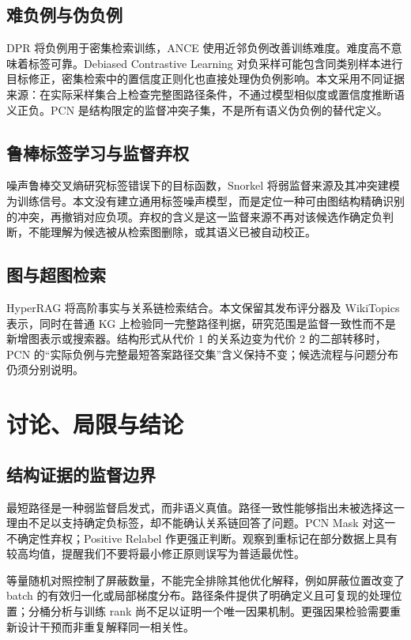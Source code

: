 \documentclass[UTF8,a4paper,10pt,fontset=fandol]{ctexart}
\begin{document}
\subsection{难负例与伪负例}
DPR 将负例用于密集检索训练，ANCE 使用近邻负例改善训练难度\cite{dpr,ance}。难度高不意味着标签可靠。Debiased Contrastive Learning 对负采样可能包含同类别样本进行目标修正\cite{debiased}，密集检索中的置信度正则化也直接处理伪负例影响\cite{false_negative}。本文采用不同证据来源：在实际采样集合上检查完整图路径条件，不通过模型相似度或置信度推断语义正负。PCN 是结构限定的监督冲突子集，不是所有语义伪负例的替代定义。

\subsection{鲁棒标签学习与监督弃权}
噪声鲁棒交叉熵研究标签错误下的目标函数\cite{gce}，Snorkel 将弱监督来源及其冲突建模为训练信号\cite{snorkel}。本文没有建立通用标签噪声模型，而是定位一种可由图结构精确识别的冲突，再撤销对应负项。弃权的含义是这一监督来源不再对该候选作确定负判断，不能理解为候选被从检索图删除，或其语义已被自动校正。

\subsection{图与超图检索}
HyperRAG 将高阶事实与关系链检索结合\cite{hyperrag}。本文保留其发布评分器及 WikiTopics 表示，同时在普通 KG 上检验同一完整路径判据，研究范围是监督一致性而不是新增图表示或搜索器。结构形式从代价 1 的关系边变为代价 2 的二部转移时，PCN 的“实际负例与完整最短答案路径交集”含义保持不变；候选流程与问题分布仍须分别说明。

\section{讨论、局限与结论}
\subsection{结构证据的监督边界}
最短路径是一种弱监督启发式，而非语义真值。路径一致性能够指出未被选择这一理由不足以支持确定负标签，却不能确认关系链回答了问题。PCN Mask 对这一不确定性弃权；Positive Relabel 作更强正判断。观察到重标记在部分数据上具有较高均值，提醒我们不要将最小修正原则误写为普适最优性。

等量随机对照控制了屏蔽数量，不能完全排除其他优化解释，例如屏蔽位置改变了 batch 的有效归一化或局部梯度分布。路径条件提供了明确定义且可复现的处理位置；分桶分析与训练 rank 尚不足以证明一个唯一因果机制。更强因果检验需要重新设计干预而非重复解释同一相关性。
\end{document}
